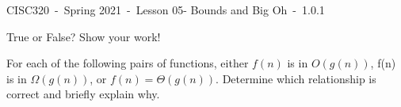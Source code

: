 \documentclass[12pt]{exam}
\newcommand{\Course}{CISC320}
\newcommand{\Semester}{Spring 2021}
\newcommand{\Assignment}{Lesson 05- Bounds and Big Oh}
\newcommand{\Version}{1.0.1}
\begin{document}

\Course~-~\Semester~-~\Assignment~-~\Version




\begin{questions}


\question[2] True or False? Show your work!


\question[3]  For each of the following pairs of functions, either $f(n)$ is in $O(g(n))$, f(n) is in $\Omega(g(n))$, or $f(n) = \Theta(g(n))$. Determine which relationship is correct and briefly explain why.

\end{questions}
\end{document}
